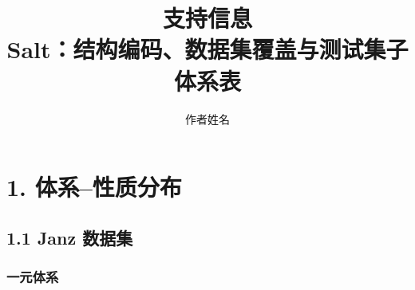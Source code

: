 \documentclass[12pt]{article}
\title{支持信息\\
\large Salt：结构编码、数据集覆盖与测试集子体系表}
\author{作者姓名}
\date{}
\begin{document}
\maketitle
\small

\section*{1. 体系--性质分布}\label{systemproperty-distribution}

\subsection*{1.1 Janz 数据集}\label{janz-dataset}

\subsubsection*{一元体系}\label{pure-system}
\end{document}
